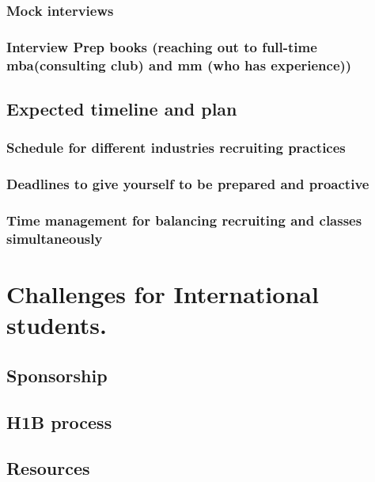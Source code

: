 \documentclass[
]{book}
\begin{document}
\hypertarget{mock-interviews}{%
\subsection{Mock interviews}\label{mock-interviews}}

\hypertarget{interview-prep-books-reaching-out-to-full-time-mbaconsulting-club-and-mm-who-has-experience}{%
\subsection{Interview Prep books (reaching out to full-time mba(consulting club) and mm (who has experience))}\label{interview-prep-books-reaching-out-to-full-time-mbaconsulting-club-and-mm-who-has-experience}}

\hypertarget{expected-timeline-and-plan}{%
\section{Expected timeline and plan}\label{expected-timeline-and-plan}}

\hypertarget{schedule-for-different-industries-recruiting-practices}{%
\subsection{Schedule for different industries recruiting practices}\label{schedule-for-different-industries-recruiting-practices}}

\hypertarget{deadlines-to-give-yourself-to-be-prepared-and-proactive}{%
\subsection{Deadlines to give yourself to be prepared and proactive}\label{deadlines-to-give-yourself-to-be-prepared-and-proactive}}

\hypertarget{time-management-for-balancing-recruiting-and-classes-simultaneously}{%
\subsection{Time management for balancing recruiting and classes simultaneously}\label{time-management-for-balancing-recruiting-and-classes-simultaneously}}

\hypertarget{challenges-for-international-students.}{%
\chapter{Challenges for International students.}\label{challenges-for-international-students.}}

\hypertarget{sponsorship}{%
\section{Sponsorship}\label{sponsorship}}

\hypertarget{h1b-process}{%
\section{H1B process}\label{h1b-process}}

\hypertarget{resources}{%
\section{Resources}\label{resources}}

  
\end{document}
